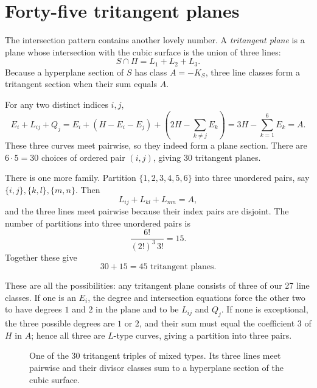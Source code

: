 \section{Forty-five tritangent planes}

The intersection pattern contains another lovely number. A \emph{tritangent plane} is a plane whose intersection with the cubic surface is the union of three lines:
\[
 S\cap\Pi=L_1+L_2+L_3.
\]
Because a hyperplane section of \(S\) has class \(A=-K_S\), three line classes form a tritangent section when their sum equals \(A\).

For any two distinct indices \(i,j\),
\[
 E_i+L_{ij}+Q_j
 =E_i+(H-E_i-E_j)
       +\left(2H-\sum_{k\ne j}E_k\right)
 =3H-\sum_{k=1}^6E_k=A.
\]
These three curves meet pairwise, so they indeed form a plane section. There are \(6\cdot5=30\) choices of ordered pair \((i,j)\), giving 30 tritangent planes.

There is one more family. Partition \(\{1,2,3,4,5,6\}\) into three unordered pairs, say \(\{i,j\},\{k,l\},\{m,n\}\). Then
\[
 L_{ij}+L_{kl}+L_{mn}=A,
\]
and the three lines meet pairwise because their index pairs are disjoint. The number of partitions into three unordered pairs is
\[
 \frac{6!}{(2!)^3\,3!}=15.
\]
Together these give
\begin{equation}
 \boxed{30+15=45\text{ tritangent planes}.}
 \label{eq:N20261109-tritangent}
\end{equation}

These are all the possibilities: any tritangent plane consists of three of our 27 line classes. If one is an \(E_i\), the degree and intersection equations force the other two to have degrees \(1\) and \(2\) in the plane and to be \(L_{ij}\) and \(Q_j\). If none is exceptional, the three possible degrees are \(1\) or \(2\), and their sum must equal the coefficient \(3\) of \(H\) in \(A\); hence all three are \(L\)-type curves, giving a partition into three pairs.

\begin{figure}[htbp]
\centering
{}
\caption{One of the 30 tritangent triples of mixed types. Its three lines meet pairwise and their divisor classes sum to a hyperplane section of the cubic surface.}
\label{fig:N20261109-tritangent}
\end{figure}

